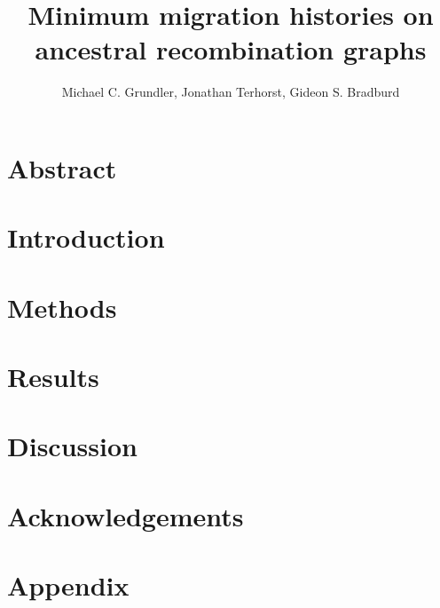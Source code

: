 \documentclass[12pt, letterpaper]{article}
\title{Minimum migration histories on ancestral recombination graphs}
\date{}
\author{Michael C. Grundler, Jonathan Terhorst, Gideon S. Bradburd}
\begin{document}
\maketitle

\begin{linenumbers}

\section*{Abstract}


\section{Introduction}


\section{Methods}


\section{Results}


\section{Discussion}


\section*{Acknowledgements}






\section*{Appendix}


\end{linenumbers}
\end{document}
